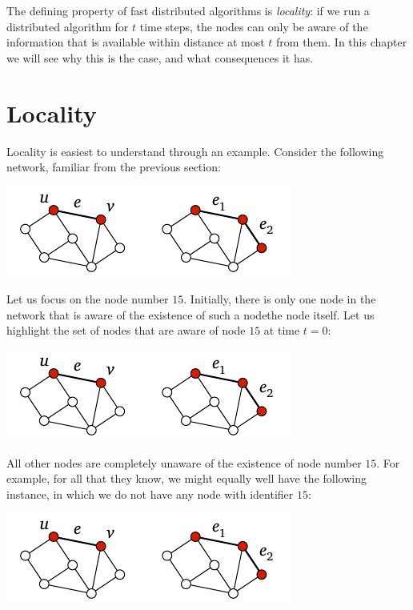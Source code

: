 
The defining property of fast distributed algorithms is \emph{locality}: if we run a distributed algorithm for $t$ time steps, the nodes can only be aware of the information that is available within distance at most $t$ from them. In this chapter we will see why this is the case, and what consequences it has.

\section{Locality}

Locality is easiest to understand through an example. Consider the following network, familiar from the previous section:
\begin{center}
    \includegraphics[page=\PIntroId]{figs.pdf}
\end{center}
Let us focus on the node number $15$. Initially, there is only one node in the network that is aware of the existence of such a node\mydash the node itself. Let us highlight the set of nodes that are aware of node $15$ at time {\boldmath $t = 0$}:
\begin{center}
    \includegraphics[page=\PIntroTA]{figs.pdf}
\end{center}
All other nodes are completely unaware of the existence of node number $15$. For example, for all that they know, we might equally well have the following instance, in which we do not have any node with identifier $15$:
\begin{center}
    \includegraphics[page=\PIntroIdX]{figs.pdf}
\end{center}

